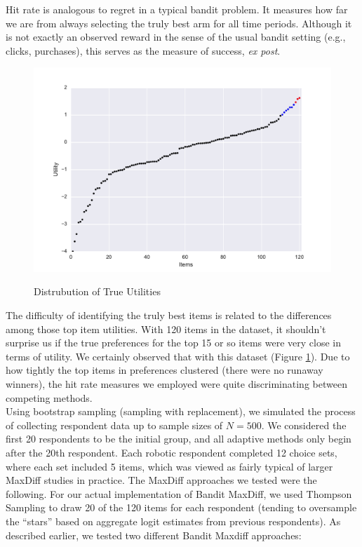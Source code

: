 \documentclass[nonblindrev]{informs3}
\begin{document}
Hit rate is analogous to regret in a typical bandit problem. It measures how far we are from always selecting the truly best arm for all time periods. Although it is not exactly an observed reward in the sense of the usual bandit setting (e.g., clicks, purchases), this serves as the measure of success, \textit{ex post}.\\
\begin{figure}[!ht]
\caption{Distrubution of True Utilities}
\includegraphics[width=1\textwidth]{plots/utilscore.pdf}
\label{fig:util}
\end{figure}
The difficulty of identifying the truly best items is related to the differences among those top item utilities. With 120 items in the dataset, it shouldn't surprise us if the true preferences for the top 15 or so items were very close in terms of utility.  We certainly observed that with this dataset (Figure \ref{fig:util}).  Due to how tightly the top items in preferences clustered (there were no runaway winners), the hit rate measures we employed were quite discriminating between competing methods.\\
Using bootstrap sampling (sampling with replacement), we simulated the process of collecting respondent data up to sample sizes of $N=500$.  We considered the first 20 respondents to be the initial group, and all adaptive methods only begin after the 20th respondent. Each robotic respondent completed 12 choice sets, where each set included 5 items, which was viewed as fairly typical of larger MaxDiff studies in practice.
The MaxDiff approaches we tested were the following. For our actual implementation of Bandit MaxDiff, we used Thompson Sampling to draw 20 of the 120 items for each respondent (tending to oversample the ``stars'' based on aggregate logit estimates from previous respondents).  As described earlier, we tested two different Bandit Maxdiff approaches:\\
\end{document}
